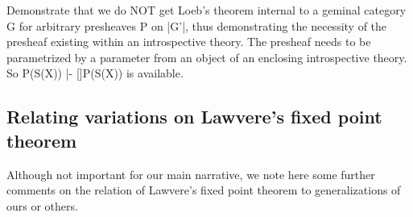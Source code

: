 \begin{TODOblock}
Demonstrate that we do NOT get Loeb's theorem internal to a geminal category G for arbitrary presheaves P on |G'|, thus demonstrating the necessity of the presheaf existing within an introspective theory. The presheaf needs to be parametrized by a parameter from an object of an enclosing introspective theory. So P(S(X)) |- []P(S(X)) is available.
\end{TODOblock}

\subsection{Relating variations on Lawvere's fixed point theorem}
Although not important for our main narrative, we note here some further comments on the relation of Lawvere's fixed point theorem to generalizations of ours or others.


